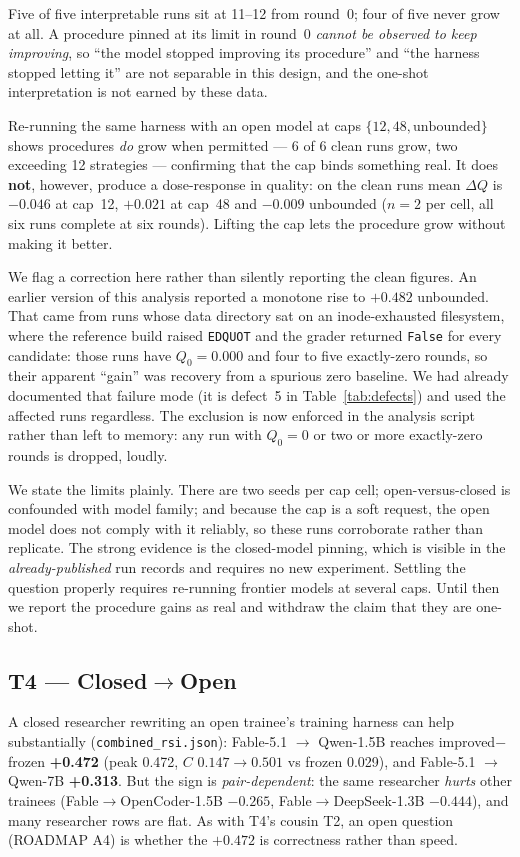 \noindent Five of five interpretable runs sit at 11--12 from round~0; four of five never grow at all. A
procedure pinned at its limit in round~0 \emph{cannot be observed to keep improving}, so ``the model stopped
improving its procedure'' and ``the harness stopped letting it'' are not separable in this design, and the
one-shot interpretation is not earned by these data.

Re-running the same harness with an open model at caps $\{12, 48, \text{unbounded}\}$ shows procedures
\emph{do} grow when permitted --- 6 of 6 clean runs grow, two exceeding 12 strategies --- confirming that the
cap binds something real. It does \textbf{not}, however, produce a dose-response in quality: on the clean runs
mean $\Delta Q$ is $-0.046$ at cap~12, $+0.021$ at cap~48 and $-0.009$ unbounded ($n{=}2$ per cell, all six runs complete at six rounds). Lifting the cap lets the procedure grow without making it better.

We flag a correction here rather than silently reporting the clean figures. An earlier version of this
analysis reported a monotone rise to $\mathbf{+0.482}$ unbounded. That came from runs whose data directory sat
on an inode-exhausted filesystem, where the reference build raised \texttt{EDQUOT} and the grader returned
\texttt{False} for every candidate: those runs have $Q_0 = 0.000$ and four to five exactly-zero rounds, so
their apparent ``gain'' was recovery from a spurious zero baseline. We had already documented that failure
mode (it is defect~5 in Table~\ref{tab:defects}) and used the affected runs regardless. The exclusion is now
enforced in the analysis script rather than left to memory: any run with $Q_0 = 0$ or two or more
exactly-zero rounds is dropped, loudly.

We state the limits plainly. There are two seeds per cap cell; open-versus-closed is confounded with model
family; and because the cap is a soft request, the open model does not comply with it reliably, so these runs
corroborate rather than replicate. The strong evidence is the closed-model pinning, which is visible in the
\emph{already-published} run records and requires no new experiment. Settling the question properly requires
re-running frontier models at several caps. Until then we report the procedure gains as real and withdraw the
claim that they are one-shot.

\subsection{T4 --- Closed$\to$Open}
A closed researcher rewriting an open trainee's training harness can help substantially
(\texttt{combined\_rsi.json}): Fable-5.1 $\to$ Qwen-1.5B reaches improved$-$frozen \textbf{+0.472} (peak 0.472,
$C$ $0.147\!\to\!0.501$ vs frozen 0.029), and Fable-5.1 $\to$ Qwen-7B \textbf{+0.313}. But the sign is
\emph{pair-dependent}: the same researcher \emph{hurts} other trainees (Fable$\to$OpenCoder-1.5B $-0.265$,
Fable$\to$DeepSeek-1.3B $-0.444$), and many researcher rows are flat. As with T4's cousin T2, an open question
(ROADMAP A4) is whether the $+0.472$ is correctness rather than speed.

